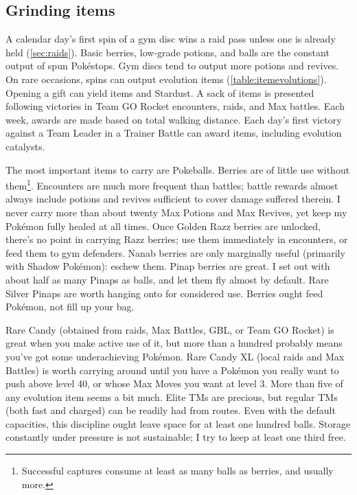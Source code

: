 \subsection{Grinding items\label{subsec:grinditems}}
A calendar day's first spin of a gym disc wins a raid pass unless one is already held (\autoref{sec:raids}).
Basic berries, low-grade potions, and balls are the constant output of spun Pokéstops.
Gym discs tend to output more potions and revives.
On rare occasions, spins can output evolution items (\autoref{table:itemevolutions}).
Opening a gift can yield items and Stardust.
A sack of items is presented following victories in Team GO Rocket encounters, raids, and Max battles.
Each week, awards are made based on total walking distance.
Each day's first victory against a Team Leader in a Trainer Battle can award items,
  including evolution catalysts.

The most important items to carry are Pokeballs.
Berries are of little use without them\footnote{Successful captures consume at least as many balls as berries, and usually more.}.
Encounters are much more frequent than battles; battle rewards almost always
 include potions and revives sufficient to cover damage suffered therein.
I never carry more than about twenty Max Potions and Max Revives, yet keep my Pokémon fully healed at all times.
Once Golden Razz berries are unlocked, there's no point in carrying Razz berries;
  use them immediately in encounters, or feed them to gym defenders.
Nanab berries are only marginally useful (primarily with Shadow Pokémon): eschew them.
Pinap berries are great.
I set out with about half as many Pinaps as balls, and let them fly almost by default.
Rare Silver Pinaps are worth hanging onto for considered use.
Berries ought feed Pokémon, not fill up your bag.

Rare Candy (obtained from raids, Max Battles, GBL, or Team GO Rocket) is great when you make active use of it, but more than a hundred
  probably means you've got some underachieving Pokémon.
Rare Candy XL (local raids and Max Battles) is worth carrying around until you have a Pokémon you really
  want to push above level 40, or whose Max Moves you want at level 3.
More than five of any evolution item seems a bit much.
Elite TMs are precious, but regular TMs (both fast and charged) can be readily
  had from routes.
Even with the default capacities, this discipline ought leave space for at least one hundred balls.
Storage constantly under pressure is not sustainable; I try to keep at least one third free.

